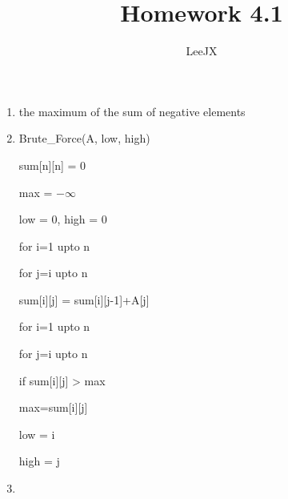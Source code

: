 \documentclass{article}
\title{Homework 4.1}
\author{LeeJX}
\begin{document}
\maketitle

\begin{enumerate}[\textbf{4.1}-1]
\item 
\par the maximum of the sum of negative elements
\item Brute\_Force(A, low, high)
\par sum[n][n] = 0
\par max = $-\infty$
\par low = 0, high = 0
\par for i=1 upto n
\par \quad for j=i upto n
\par \quad \quad sum[i][j] = sum[i][j-1]+A[j]
\par for i=1 upto n
\par \quad for j=i upto n
\par \quad \quad if sum[i][j] > max
\par \quad \quad \quad max=sum[i][j]
\par \quad \quad \quad low = i
\par \quad \quad \quad high = j
\item 
\end{enumerate}
\end{document}
